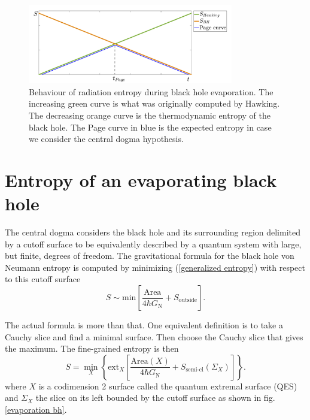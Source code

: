 \begin{figure}
    \centering
    \includegraphics[width=0.8\textwidth]{figures/page_island.png}
    \caption{Behaviour of radiation entropy during black hole evaporation. The increasing green curve is what was originally computed by Hawking. The decreasing orange curve is the thermodynamic entropy of the black hole. The Page curve in blue is the expected entropy in case we consider the central dogma hypothesis.}
    \label{Page curve}
\end{figure}

\section{Entropy of an evaporating black hole}

The central dogma considers the black hole and its surrounding region delimited by a cutoff surface to be equivalently described by a quantum system with large, but finite, degrees of freedom. The gravitational formula for the black hole von Neumann entropy is computed by minimizing (\ref{generalized entropy}) with respect to this cutoff surface
\begin{equation}\label{approx gravitational fine grained}
    S \sim \text{min}\left[\frac{\text{Area}}{4\hbar G_\text{N}} + S_\text{outside}\right].
\end{equation}

The actual formula is more than that. One equivalent definition is to take a Cauchy slice and find a minimal surface. Then choose the Cauchy slice that gives the maximum. The fine-grained entropy is then
\begin{equation}\label{gravitational fine grained}
    S = \min_X\left\{\text{ext}_X\left[\frac{\text{Area}\left(X\right)}{4\hbar G_\text{N}} + S_\text{semi-cl}\left(\Sigma_X\right)\right]\right\}.
\end{equation}
where $X$ is a codimension 2 surface called the quantum extremal surface (QES) and $\Sigma_X$ the slice on its left bounded by the cutoff surface as shown in fig. \ref{evaporation bh}.

